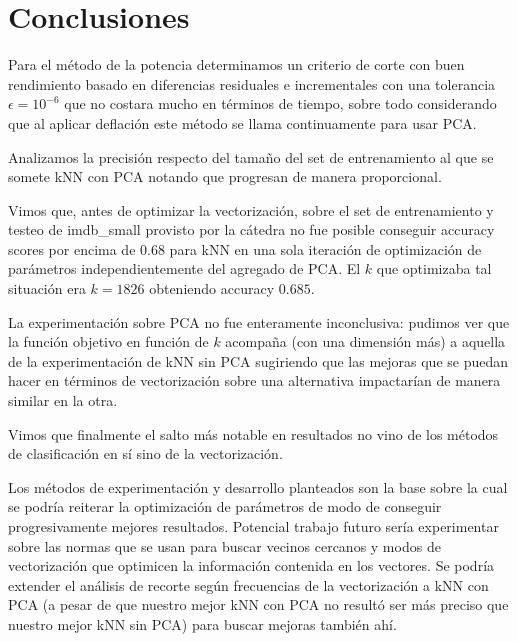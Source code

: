 \section{Conclusiones}%

Para el método de la potencia determinamos un criterio de corte con buen rendimiento basado en diferencias residuales e incrementales con una tolerancia $\epsilon = 10^{-6}$ que no costara mucho en términos de tiempo, sobre todo considerando que al aplicar deflación este método se llama continuamente para usar PCA.

Analizamos la precisión respecto del tamaño del set de entrenamiento al que se somete kNN con PCA notando que progresan de manera proporcional.

Vimos que, antes de optimizar la vectorización, sobre el set de entrenamiento y testeo de imdb\_small provisto por la cátedra no fue posible conseguir accuracy scores por encima de $0.68$ para kNN en una sola iteración de optimización de parámetros independientemente del agregado de PCA. El $k$ que optimizaba tal situación era $k=1826$ obteniendo accuracy $0.685$.

La experimentación sobre PCA no fue enteramente inconclusiva: pudimos ver que la función objetivo en función de $k$ acompaña (con una dimensión más) a aquella de la experimentación de kNN sin PCA sugiriendo que las mejoras que se puedan hacer en términos de vectorización sobre una alternativa impactarían de manera similar en la otra.

Vimos que finalmente el salto más notable en resultados no vino de los métodos de clasificación en sí sino de la vectorización.

Los métodos de experimentación y desarrollo planteados son la base sobre la cual se podría reiterar la optimización de parámetros de modo de conseguir progresivamente mejores resultados.
Potencial trabajo futuro sería experimentar sobre las normas que se usan para buscar vecinos cercanos y modos de vectorización que optimicen la información contenida en los vectores. Se podría extender el análisis de recorte según frecuencias de la vectorización a kNN con PCA (a pesar de que nuestro mejor kNN con PCA no resultó ser más preciso que nuestro mejor kNN sin PCA) para buscar mejoras también ahí.

\label{sec:conclusiones}
